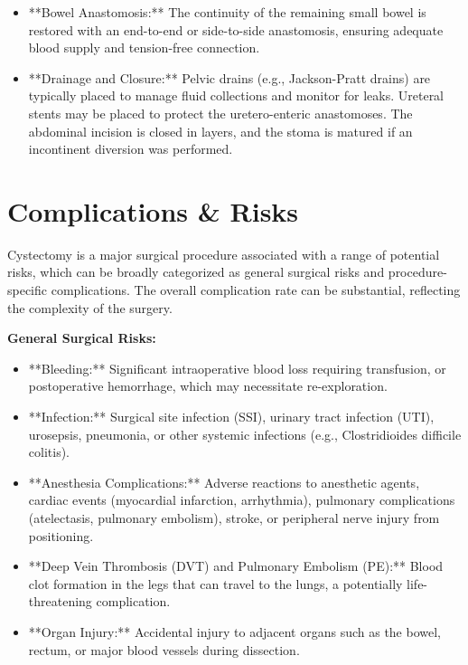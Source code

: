 \begin{itemize}
  \item **Bowel Anastomosis:** The continuity of the remaining small bowel is restored with an end-to-end or side-to-side anastomosis, ensuring adequate blood supply and tension-free connection.
  
  \item **Drainage and Closure:** Pelvic drains (e.g., Jackson-Pratt drains) are typically placed to manage fluid collections and monitor for leaks. Ureteral stents may be placed to protect the uretero-enteric anastomoses. The abdominal incision is closed in layers, and the stoma is matured if an incontinent diversion was performed.
\end{itemize}

\section*{Complications \& Risks}
Cystectomy is a major surgical procedure associated with a range of potential risks, which can be broadly categorized as general surgical risks and procedure-specific complications. The overall complication rate can be substantial, reflecting the complexity of the surgery.

\textbf{General Surgical Risks:}
\begin{itemize}
  \item **Bleeding:** Significant intraoperative blood loss requiring transfusion, or postoperative hemorrhage, which may necessitate re-exploration.
  
  \item **Infection:** Surgical site infection (SSI), urinary tract infection (UTI), urosepsis, pneumonia, or other systemic infections (e.g., Clostridioides difficile colitis).
  
  \item **Anesthesia Complications:** Adverse reactions to anesthetic agents, cardiac events (myocardial infarction, arrhythmia), pulmonary complications (atelectasis, pulmonary embolism), stroke, or peripheral nerve injury from positioning.
  
  \item **Deep Vein Thrombosis (DVT) and Pulmonary Embolism (PE):** Blood clot formation in the legs that can travel to the lungs, a potentially life-threatening complication.
  
  \item **Organ Injury:** Accidental injury to adjacent organs such as the bowel, rectum, or major blood vessels during dissection.
\end{itemize}

